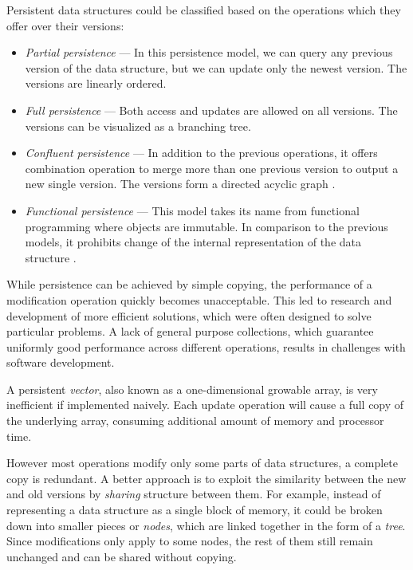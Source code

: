 Persistent data structures could be classified based on the operations which they offer over their versions:
\begin{itemize}
    \item \textit{Partial persistence} --- In this persistence model, we can query any previous version of the data structure, but we can update only the newest version. The versions are linearly ordered.
    \item \textit{Full persistence} --- Both access and updates are allowed on all versions. The versions can be visualized as a branching tree.
    \item \textit{Confluent persistence} --- In addition to the previous operations, it offers combination operation to merge more than one previous version to output a new single version. The versions form a directed acyclic graph \cite{fully-persistent-lists-with-catenation}.
    \item \textit{Functional persistence} --- This model takes its name from functional programming where objects are immutable. In comparison to the previous models, it prohibits change of the internal representation of the data structure \cite{purely-functional-data-structures}.
\end{itemize}

While persistence can be achieved by simple copying, the performance of a modification operation quickly becomes unacceptable. This led to research and development of more efficient solutions, which were often designed to solve particular problems. A lack of general purpose collections, which guarantee uniformly good performance across different operations, results in challenges with software development.

A persistent \emph{vector}, also known as a one-dimensional growable array, is very inefficient if implemented naively. Each update operation will cause a full copy of the underlying array, consuming additional amount of memory and processor time.

However most operations modify only some parts of data structures, a complete copy is redundant. A better approach is to exploit the similarity between the new and old versions by \emph{sharing} structure between them. For example, instead of representing a data structure as a single block of memory, it could be broken down into smaller pieces or \emph{nodes}, which are linked together in the form of a \emph{tree}. Since modifications only apply to some nodes, the rest of them still remain unchanged and can be shared without copying.


